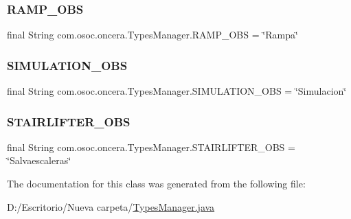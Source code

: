 \subsubsection{\texorpdfstring{RAMP\_OBS}{RAMP\_OBS}}
{\footnotesize\ttfamily final String com.\+osoc.\+oncera.\+Types\+Manager.\+R\+A\+M\+P\+\_\+\+O\+BS = \char`\"{}Rampa\char`\"{}\hspace{0.3cm}{\ttfamily [static]}}

\mbox{\label{classcom_1_1osoc_1_1oncera_1_1_types_manager_a88caa94a1d084d188fe38aa5a362e514}} 
\subsubsection{\texorpdfstring{SIMULATION\_OBS}{SIMULATION\_OBS}}
{\footnotesize\ttfamily final String com.\+osoc.\+oncera.\+Types\+Manager.\+S\+I\+M\+U\+L\+A\+T\+I\+O\+N\+\_\+\+O\+BS = \char`\"{}Simulacion\char`\"{}\hspace{0.3cm}{\ttfamily [static]}}

\mbox{\label{classcom_1_1osoc_1_1oncera_1_1_types_manager_a1d188c66c4532707453749a60f653d0f}} 
\subsubsection{\texorpdfstring{STAIRLIFTER\_OBS}{STAIRLIFTER\_OBS}}
{\footnotesize\ttfamily final String com.\+osoc.\+oncera.\+Types\+Manager.\+S\+T\+A\+I\+R\+L\+I\+F\+T\+E\+R\+\_\+\+O\+BS = \char`\"{}Salvaescaleras\char`\"{}\hspace{0.3cm}{\ttfamily [static]}}



The documentation for this class was generated from the following file\+:\begin{DoxyCompactItemize}
\item 
D\+:/\+Escritorio/\+Nueva carpeta/\mbox{\hyperlink{_types_manager_8java}{Types\+Manager.\+java}}\end{DoxyCompactItemize}
